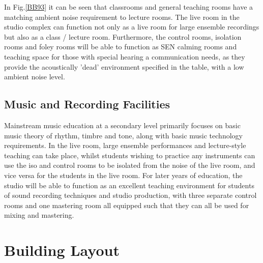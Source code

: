 \documentclass[10pt, twocolumn]{article}
\begin{document}
            In Fig.\ref{BB93} it can be seen that classrooms and general teaching rooms have a matching ambient noise requirement to lecture rooms.
            The live room in the studio complex can function not only as a live room for large ensemble recordings but also as a class / lecture room.
            Furthermore, the control rooms, isolation rooms and foley rooms will be able to function as SEN calming rooms and teaching space for those with special hearing a communication needs, as they provide the acoustically 'dead' environment specified in the table, with a low ambient noise level.

        \subsection{Music and Recording Facilities}
            Mainstream music education at a secondary level primarily focuses on basic music theory of rhythm, timbre and tone, along with basic music technology requirements.
            In the live room, large ensemble performances and lecture-style teaching can take place, whilst students wishing to practice any instruments can use the iso and control rooms to be isolated from the noise of the live room, and vice versa for the students in the live room.
            For later years of education, the studio will be able to function as an excellent teaching environment for students of sound recording techniques and studio production, with three separate control rooms and one mastering room all equipped such that they can all be used for mixing and mastering.

    \section{Building Layout}
\end{document}
